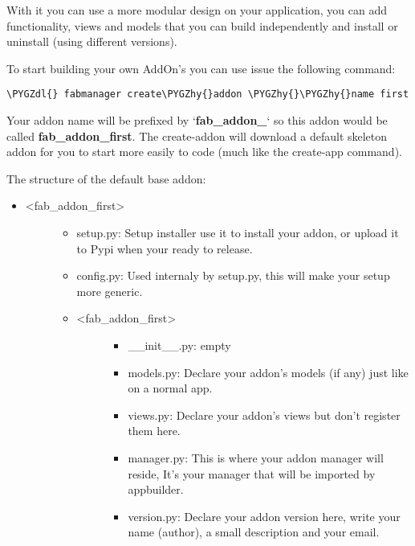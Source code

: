 \documentclass[letterpaper,10pt,english]{sphinxmanual}
\def\PYGZdl{\char`\$}
\def\PYGZhy{\char`\-}
\begin{document}
With it you can use a more modular design on your application, you can add functionality,
views and models that you can build independently and install or uninstall (using different versions).

To start building your own AddOn's you can use issue the following command:

\begin{Verbatim}[commandchars=\\\{\}]
\PYGZdl{} fabmanager create\PYGZhy{}addon \PYGZhy{}\PYGZhy{}name first
\end{Verbatim}

Your addon name will be prefixed by `{\color{red}\bfseries{}fab\_addon\_}` so this addon would be called \textbf{fab\_addon\_first}.
The create-addon will download a default skeleton addon for you to start more easily to code (much like the create-app
command).

The structure of the default base addon:
\begin{itemize}
\item {} \begin{description}
\item[{\textless{}fab\_addon\_first\textgreater{}}] \leavevmode\begin{itemize}
\item {} 
setup.py: Setup installer use it to install your addon, or upload it to Pypi when your ready to release.

\item {} 
config.py: Used internaly by setup.py, this will make your setup more generic.

\item {} \begin{description}
\item[{\textless{}fab\_addon\_first\textgreater{}}] \leavevmode\begin{itemize}
\item {} 
\_\_init\_\_.py: empty

\item {} 
models.py: Declare your addon's models (if any) just like on a normal app.

\item {} 
views.py: Declare your addon's views but don't register them here.

\item {} 
manager.py: This is where your addon manager will reside, It's your manager that will be imported by appbuilder.

\item {} 
version.py: Declare your addon version here, write your name (author), a small description and your email.

\end{itemize}

\end{description}

\end{itemize}

\end{description}

\end{itemize}
\end{document}
